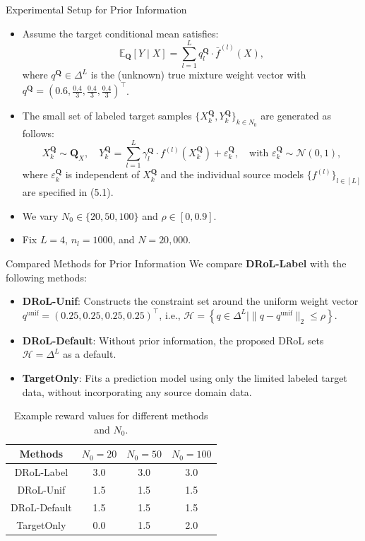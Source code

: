 \documentclass{beamer}
\begin{document}
\begin{frame}{Experimental Setup for Prior Information}
    \begin{itemize}
        \item Assume the target conditional mean satisfies:
        \[
        \mathbb{E}_{\mathbf{Q}}[Y \mid X] = \sum_{l=1}^{L} q_l^{\mathbf{Q}} \cdot \bar{f}^{(l)}(X),
        \]
        where $q^{\mathbf{Q}} \in \Delta^{L}$ is the (unknown) true mixture weight vector with $q^{\mathbf{Q}} = (0.6, \frac{0.4}{3}, \frac{0.4}{3}, \frac{0.4}{3})^{\intercal}$.
        \item The small set of labeled target samples $\{X_k^{\mathbf{Q}}, Y_k^{\mathbf{Q}}\}_{k \in N_0}$ are generated as follows:
        \[
        X_k^{\mathbf{Q}} \sim \mathbf{Q}_X, \quad Y_k^{\mathbf{Q}} = \sum_{l=1}^{L} \gamma_l^{\mathbf{Q}} \cdot f^{(l)}(X_k^{\mathbf{Q}}) + \varepsilon_k^{\mathbf{Q}}, \quad \text{with } \varepsilon_k^{\mathbf{Q}} \sim \mathcal{N}(0, 1),
        \]
        where $\varepsilon_k^{\mathbf{Q}}$ is independent of $X_k^{\mathbf{Q}}$ and the individual source models $\{f^{(l)}\}_{l \in [L]}$ are specified in (5.1).
        \item We vary $N_0 \in \{20, 50, 100\}$ and $\rho \in [0, 0.9]$.
        \item Fix $L = 4$, $n_l = 1000$, and $N = 20,000$.
    \end{itemize}
\end{frame}

\begin{frame}{Compared Methods for Prior Information}
    We compare \textbf{DRoL-Label} with the following methods:
    \begin{itemize}
        \item \textbf{DRoL-Unif}: Constructs the constraint set around the uniform weight vector $q^{\mathrm{unif}} = (0.25, 0.25, 0.25, 0.25)^{\top}$, i.e., $\mathcal{H} = \left\{ q \in \Delta^{L} \mid \| q - q^{\mathrm{unif}} \|_2 \leq \rho \right\}$.
        \item \textbf{DRoL-Default}: Without prior information, the proposed DRoL sets $\mathcal{H} = \Delta^{L}$ as a default.
        \item \textbf{TargetOnly}: Fits a prediction model using only the limited labeled target data, without incorporating any source domain data.
    \end{itemize}
    \begin{table}[h]
        \centering
        \scriptsize
        \begin{tabular}{c|c|c|c}
            \hline
            Methods & $N_0 = 20$ & $N_0 = 50$ & $N_0 = 100$ \\
            \hline
            DRoL-Label & 3.0 & 3.0 & 3.0 \\
            DRoL-Unif & 1.5 & 1.5 & 1.5 \\
            DRoL-Default & 1.5 & 1.5 & 1.5 \\
            TargetOnly & 0.0 & 1.5 & 2.0 \\
            \hline
        \end{tabular}
        \caption{Example reward values for different methods and $N_0$.}
    \end{table}
\end{frame}
\end{document}
